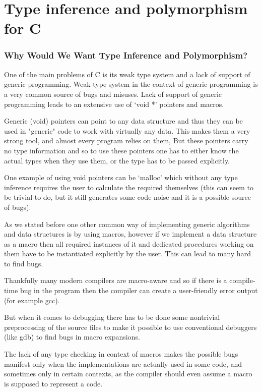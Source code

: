 \chapter{Type inference and polymorphism for C}

\subsection{Why Would We Want Type Inference and Polymorphism?}

One of the main problems of C is its weak type system and a lack of support of generic programming. Weak type system in the context of generic programming is a very common source of bugs and misuses. Lack of support of generic programming leads to an extensive use of `void *' pointers and macros. %

Generic (void) pointers can point to any data structure and thus they can be used in "generic" code to work with virtually any data. This makes them a very strong tool, and almost every program relies on them, %
But these pointers carry no type information and so to use these pointers one has to either know the actual types when they use them, or the type has to be passed explicitly.

One example of using void pointers can be `malloc' which without any type inference requires the user to calculate the required themselves (this can seem to be trivial to do, but it still generates some code noise and it is a possible source of bugs).

As we stated before one other common way of implementing generic algorithms and data structures is by using macros, however if we implement a data structure as a macro then all required instances of it and dedicated procedures working on them have to be instantiated explicitly by the user. This can lead to many hard to find bugs.

Thankfully many modern compilers are macro-aware and so if there is a compile-time bug in the program then the compiler can create a user-friendly error output (for example gcc). %

But when it comes to debugging there has to be done some nontrivial preprocessing of the source files to make it possible to use conventional debuggers (like gdb) to find bugs in macro expansions. %

The lack of any type checking in context of macros makes the possible bugs manifest only when the implementations are actually used in some code, and sometimes only in certain contexts, as the compiler should even assume a macro is supposed to represent a code.


